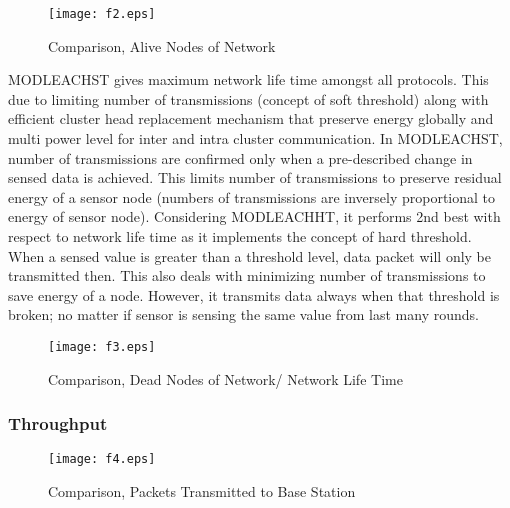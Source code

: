\documentclass[10pt, conference, compsocconf]{IEEEtran}
\begin{document}
\begin{figure}
\begin{center}
\texttt{[image: f2.eps]}
\caption{Comparison, Alive Nodes of Network}
\end{center}
\end{figure}

MODLEACHST gives maximum network life time amongst all protocols. This due to limiting number of transmissions (concept of soft threshold) along with efficient cluster head replacement mechanism that preserve energy globally and multi power level for inter and intra cluster communication. In MODLEACHST, number of transmissions are confirmed only when a pre-described change in sensed data is achieved. This limits number of transmissions to preserve residual energy of a sensor node (numbers of transmissions are inversely proportional to energy of sensor node). Considering MODLEACHHT, it performs 2nd best with respect to network life time as it implements the concept of hard threshold. When a sensed value is greater than a threshold level, data packet will only be transmitted then. This also deals with minimizing number of transmissions to save energy of a node. However, it transmits data always when that threshold is broken; no matter if sensor is sensing the same value from last many rounds.

\begin{figure}
\begin{center}
\texttt{[image: f3.eps]}
\caption{Comparison, Dead Nodes of Network/ Network Life Time}
\end{center}
\end{figure}

\subsubsection{Throughput}

\begin{figure}
\begin{center}
\texttt{[image: f4.eps]}
\caption{Comparison, Packets Transmitted to Base Station}
\end{center}
\end{figure}
\end{document}
